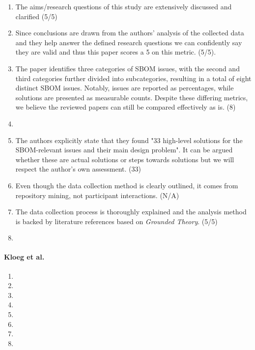 \begin{enumerate}
    \item The aims/research questions of this study are extensively discussed and clarified (5/5)
    \item Since conclusions are drawn from the authors' analysis of the collected data and they help answer the defined research questions we can confidently say they are valid and thus this paper scores a 5 on this metric. (5/5).
    \item The paper identifies three categories of SBOM issues, with the second and third categories further divided into subcategories, resulting in a total of eight distinct SBOM issues. Notably, issues are reported as percentages, while solutions are presented as measurable counts. Despite these differing metrics, we believe the reviewed papers can still be compared effectively as is. (8)
    \item
    \item The authors explicitly state that they found "33 high-level solutions for the SBOM-relevant issues and their main design problem". It can be argued whether these are actual solutions or steps towards solutions but we will respect the author's own assessment. (33)
    \item Even though the data collection method is clearly outlined, it comes from repository mining, not participant interactions. (N/A)
    \item The data collection process is thoroughly explained and the analysis method is backed by literature references based on \emph{Grounded Theory}. (5/5)
    \item
\end{enumerate}

\paragraph{Kloeg et al. \cite{article:business-sbom}}

\begin{enumerate}
    \item
    \item
    \item
    \item
    \item
    \item
    \item
    \item
\end{enumerate}


